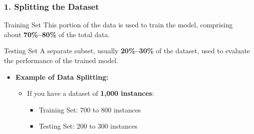 \documentclass[aspectratio=169]{beamer}
\begin{document}
\begin{frame}[fragile]
    \frametitle{1. Splitting the Dataset}
    \begin{block}{Training Set}
        This portion of the data is used to train the model, comprising about \textbf{70\%--80\%} of the total data.
    \end{block}
    
    \begin{block}{Testing Set}
        A separate subset, usually \textbf{20\%--30\%} of the dataset, used to evaluate the performance of the trained model.
    \end{block}
    
    \begin{itemize}
        \item \textbf{Example of Data Splitting:}
        \begin{itemize}
            \item If you have a dataset of \textbf{1,000 instances}:
            \begin{itemize}
                \item Training Set: 700 to 800 instances
                \item Testing Set: 200 to 300 instances
            \end{itemize}
        \end{itemize}
    \end{itemize}
\end{frame}
\end{document}
